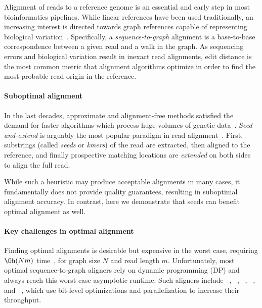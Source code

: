 
Alignment of reads to a reference genome is an essential and early step in most
bioinformatics pipelines. While linear references have been used traditionally,
an increasing interest is directed towards graph references capable of
representing biological variation~\citep{garrison_variation_2018}.
%
Specifically, a \emph{sequence-to-graph} alignment is a base-to-base
correspondence between a given read and a walk in the graph. As sequencing
errors and biological variation result in inexact read alignments, edit distance
is the most common metric that alignment algorithms optimize in order to find
the most probable read origin in the reference.


\paragraph{Suboptimal alignment}
%
In the last decades, approximate and alignment-free methods satisfied the demand
for faster algorithms which process huge volumes of genetic
data~\citep{kucherov2019evolution}. 
%
\emph{Seed-and-extend} is arguably the most popular paradigm in read
alignment~\citep{altschul_basic_1990,langmead_fast_2012,li_fast_2009}. First,
substrings (called \emph{seeds} or \emph{kmers}) of the read are extracted, then
aligned to the reference, and finally prospective matching locations are
\emph{extended} on both sides to align the full read.

While such a heuristic may produce acceptable alignments in many cases, it
fundamentally does not provide quality guarantees, resulting in suboptimal
alignment accuracy.
%
In contrast, here we demonstrate that seeds can benefit optimal alignment as
well.

\paragraph{Key challenges in optimal alignment}
%
Finding optimal alignments is desirable but expensive in the worst case,
requiring $\Oh(Nm)$ time~\citep{equi2019complexity}, for graph size $N$ and read
length $m$.
%
Unfortunately, most optimal sequence-to-graph aligners rely on dynamic
programming (DP) and always reach this worst-case asymptotic runtime. Such
aligners include \vargas~\citep{darby2020vargas},
\pasgal~\citep{jain_accelerating_2019},
\graphaligner~\citep{rautiainen_bitparallel_2019},
\hga~\citep{feng2021accelerating}, and \vg~\citep{garrison_variation_2018},
which use bit-level optimizations and parallelization to increase their
throughput.

